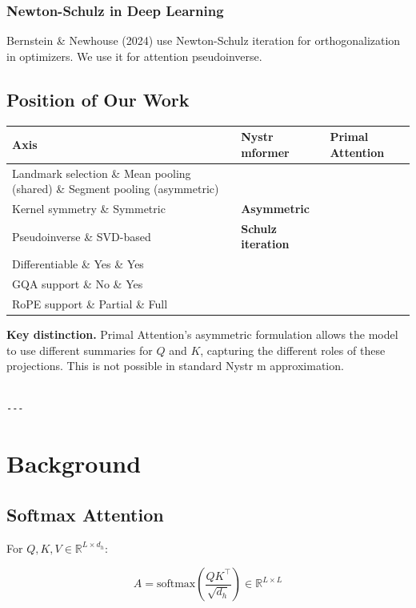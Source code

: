 \subsubsection{Newton-Schulz in Deep Learning}

Bernstein \& Newhouse (2024) use Newton-Schulz iteration for orthogonalization 
in optimizers. We use it for attention pseudoinverse.

\subsection{Position of Our Work}

\begin{table}[H]
\centering
\small
\begin{tabular}{lll}
\toprule
\textbf{Axis} & \textbf{Nystr mformer} & \textbf{Primal Attention} \\
\midrule
Landmark selection \& Mean pooling (shared) \& Segment pooling (asymmetric) \\
Kernel symmetry \& Symmetric & \textbf{Asymmetric} \\
Pseudoinverse \& SVD-based & \textbf{Schulz iteration} \\
Differentiable \& Yes \& Yes \\
GQA support \& No \& Yes \\
RoPE support \& Partial \& Full \\
\bottomrule
\end{tabular}
\end{table}

\textbf{Key distinction.} Primal Attention's asymmetric formulation allows the 
model to use different summaries for $Q$ and $K$, capturing the different 
roles of these projections. This is not possible in standard Nystr m 
approximation.
\begin{lstlisting}

---
\end{lstlisting}


\section{Background}

\subsection{Softmax Attention}

For $Q, K, V \in \mathbb{R}^{L \times d_h}$:

\[
A = \text{softmax}\!\left(\frac{Q K^\top}{\sqrt{d_h}}\right) \in \mathbb{R}^{L \times L}
\]

